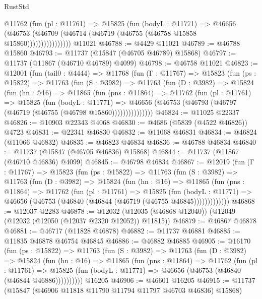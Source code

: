 \begin{lexlean}{RustStd}
\begin{coremodule}
                  @11762
                    (fun (pl : @11761) =>
                    @15825
                      (fun (bodyL : @11771) =>
                      @46656
                        (@46753
                          (@46709 (@46714 (@46719 (@46755 (@46758 @15858 @15860))))))))))))))))
    @11021
@46788 := @4429 @11021
@46789 := @46788 @15860
@46793 := @11737 (@15847 (@46705 @46789) @15868)
@46797 := @11737 (@11867 (@46710 @46789) @4099)
@46798 := @46758 @11021
@46823 := @12001
    (fun (tail0 : @4444) =>
    @11768
      (fun (Γ : @11767) =>
      @15823
        (fun (ps : @15822) =>
        @11763
          (fun (S : @3982) =>
          @11763
            (fun (D : @3982) =>
            @15824
              (fun (hn : @16) =>
              @11865
                (fun (pns : @11864) =>
                @11762
                  (fun (pl : @11761) =>
                  @15825
                    (fun (bodyL : @11771) =>
                    @46656 (@46753 (@46793 (@46797 (@46719 (@46755 (@46798 @15860)))))))))))))))
@46824 := @11025 @22337
@46826 := @10903 @22343 @4068
@46830 := @4686 (@5839 (@4522 @46826)) @4723
@46831 := @22341 @46830
@46832 := @11068 @46831
@46834 := @46824 (@11066 @46832)
@46835 := @46823 @46834
@46836 := @46788 @46834
@46840 := @11737 (@15847 (@46705 @46836) @15868)
@46844 := @11737 (@11867 (@46710 @46836) @4099)
@46845 := @46798 @46834
@46867 := @12019
    (fun (Γ : @11767) =>
    @15823
      (fun (ps : @15822) =>
      @11763
        (fun (S : @3982) =>
        @11763
          (fun (D : @3982) =>
          @15824
            (fun (hn : @16) =>
            @11865
              (fun (pns : @11864) =>
              @11762
                (fun (pl : @11761) =>
                @15825
                  (fun (bodyL : @11771) =>
                  @46656 (@46753 (@46840 (@46844 (@46719 (@46755 @46845)))))))))))))
@46868 := @12037 @2283
@46878 := @12032 (@12035 (@46868 @12040)) (@12049 (@12032 (@12050 (@12037 @2320 @12052)) @11815))
@46879 := @46867 @46878
@46881 := @46717 (@11828 @46878)
@46882 := @11737 @46881
@46885 := @11835 @46878 @46754 @46845
@46886 := @46882 @46885
@46905 := @16170
    (fun (ps : @15822) =>
    @11763
      (fun (S : @3982) =>
      @11763
        (fun (D : @3982) =>
        @15824
          (fun (hn : @16) =>
          @11865
            (fun (pns : @11864) =>
            @11762
              (fun (pl : @11761) =>
              @15825 (fun (bodyL : @11771) => @46656 (@46753 (@46840 (@46844 @46886))))))))))
    @16205
@46906 := @46601 @16205
@46915 := @11737 (@15847 (@46906 @11818 @11790 @11794 @11797 @46703 @46836) @15868)

\end{coremodule}
\end{lexlean}
